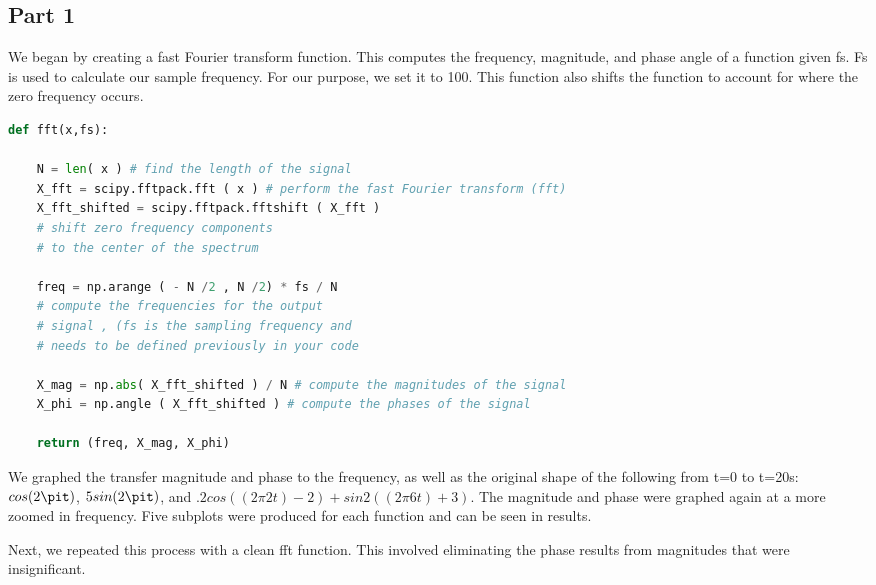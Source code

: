 \documentclass[12pt]{report}
\begin{document}
\subsection*{Part 1}
\setlength{\parindent}{5ex}
We began by creating a fast Fourier transform function. This computes the frequency, magnitude, and phase angle of a function given fs. Fs is used to calculate our sample frequency. For our purpose, we set it to 100. This function also shifts the function to account for where the zero frequency occurs. 
\begin{lstlisting}[language=Python, caption= Fast Fourier transform]
def fft(x,fs):
    
    N = len( x ) # find the length of the signal
    X_fft = scipy.fftpack.fft ( x ) # perform the fast Fourier transform (fft)
    X_fft_shifted = scipy.fftpack.fftshift ( X_fft )    
    # shift zero frequency components
    # to the center of the spectrum

    freq = np.arange ( - N /2 , N /2) * fs / N        
    # compute the frequencies for the output
    # signal , (fs is the sampling frequency and
    # needs to be defined previously in your code
    
    X_mag = np.abs( X_fft_shifted ) / N # compute the magnitudes of the signal
    X_phi = np.angle ( X_fft_shifted ) # compute the phases of the signal

    return (freq, X_mag, X_phi)
\end{lstlisting}
\newpage

We graphed the transfer magnitude and phase to the frequency, as well as the original shape of the following from t=0 to t=20s: $cos(2\pit)$, $ 5sin(2\pit)$, and .$ 2cos((2\pi 2t) − 2) + sin2((2\pi 6t) + 3)$. The magnitude and phase were graphed again at a more zoomed in frequency. Five subplots were produced for each function and can be seen in results.

Next, we repeated this process with a clean fft function. This involved eliminating the phase results from magnitudes that were insignificant. 
  
\end{document}
